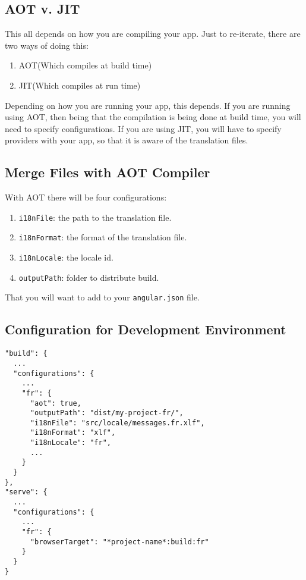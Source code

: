 \subsection{AOT v. JIT}
This all depends on how you are compiling your app. Just to re-iterate, there  are two ways of doing this:
\begin{enumerate}
  \item AOT(Which compiles at build time)
  \item JIT(Which compiles at run time)
\end{enumerate}

Depending on how you are running your app, this depends. If you are running using AOT, then being that the compilation is being done at build time, you will need to specify configurations. If you are using JIT, you will have to specify providers with your app, so that it is aware of the translation files.

\subsection{Merge Files with AOT Compiler}
With AOT there will be four configurations: 
\begin{enumerate}
  \item \lstinline{i18nFile}: the path to the translation file.
  \item \lstinline{i18nFormat}: the format of the translation file.
  \item \lstinline{i18nLocale}: the locale id.
  \item \lstinline{outputPath}: folder to distribute build.
\end{enumerate}

That you will want to add to your \lstinline{angular.json} file.

\subsection{Configuration for Development Environment}

\begin{lstlisting}[caption=angular.json]
"build": {
  ...
  "configurations": {
    ...
    "fr": {
      "aot": true,
      "outputPath": "dist/my-project-fr/",
      "i18nFile": "src/locale/messages.fr.xlf",
      "i18nFormat": "xlf",
      "i18nLocale": "fr",
      ...
    }
  }
},
"serve": {
  ...
  "configurations": {
    ...
    "fr": {
      "browserTarget": "*project-name*:build:fr"
    }
  }
}  
\end{lstlisting}

